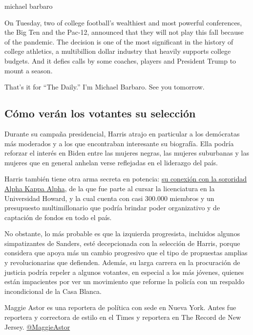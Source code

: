 michael barbaro

On Tuesday, two of college football's wealthiest and most powerful
conferences, the Big Ten and the Pac-12, announced that they will not
play this fall because of the pandemic. The decision is one of the most
significant in the history of college athletics, a multibillion dollar
industry that heavily supports college budgets. And it defies calls by
some coaches, players and President Trump to mount a season.

That's it for ``The Daily.'' I'm Michael Barbaro. See you tomorrow.

\hypertarget{cuxf3mo-veruxe1n-los-votantes-su-selecciuxf3n}{%
\subsection{Cómo verán los votantes su
selección}\label{cuxf3mo-veruxe1n-los-votantes-su-selecciuxf3n}}

Durante su campaña presidencial, Harris atrajo en particular a los
demócratas más moderados y a los que encontraban interesante su
biografía. Ella podría reforzar el interés en Biden entre las mujeres
negras, las mujeres suburbanas y las mujeres que en general anhelan
verse reflejadas en el liderazgo del país.

Harris también tiene otra arma secreta en potencia:
\href{https://www.nytimes3xbfgragh.onion/2019/07/01/us/politics/kamala-harris-alpha-kappa-alpha.html}{su
conexión con la sororidad Alpha Kappa Alpha}, de la que fue parte al
cursar la licenciatura en la Universidad Howard, y la cual cuenta con
casi 300.000 miembros y un presupuesto multimillonario que podría
brindar poder organizativo y de captación de fondos en todo el país.

No obstante, lo más probable es que la izquierda progresista, incluidos
algunos simpatizantes de Sanders, esté decepcionada con la selección de
Harris, porque considera que apoya más un cambio progresivo que el tipo
de propuestas amplias y revolucionarias que defienden. Además, su larga
carrera en la procuración de justicia podría repeler a algunos votantes,
en especial a los más jóvenes, quienes están impacientes por ver un
movimiento que reforme la policía con un respaldo incondicional de la
Casa Blanca.

Maggie Astor es una reportera de política con sede en Nueva York. Antes
fue reportera y correctora de estilo en el Times y reportera en The
Record de New Jersey.
\href{https://twitter.com/MaggieAstor}{@MaggieAstor}

